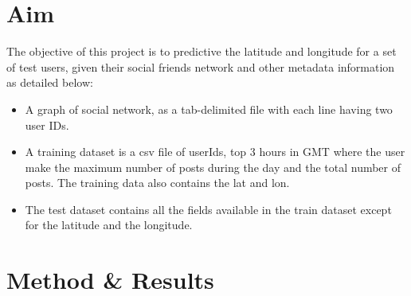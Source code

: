 

\section{Aim}
The objective of this project is to predictive the latitude and longitude for a set of test users, given their social friends network and other metadata information as detailed below:

\begin{itemize}
\item A graph of social network, as a tab-delimited file with each line having two user IDs.
\item A training dataset is a csv file of userIds, top 3 hours in GMT where the user make the maximum number of posts during the day and the total number of posts. The training data also contains the lat and lon.
\item The test dataset contains all the fields available in the train dataset except for the latitude and the longitude.
\end{itemize}

\section{Method \& Results}



